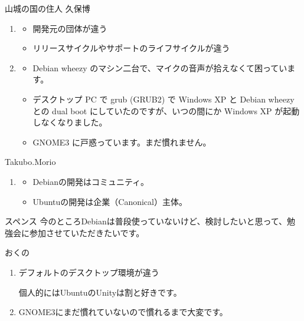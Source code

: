 \documentclass[mingoth,a4paper]{jsarticle}
\begin{document}
\begin{prework}{ 山城の国の住人 久保博 }
  \begin{enumerate}
  \item
    \begin{itemize}
    \item 開発元の団体が違う
    \item リリースサイクルやサポートのライフサイクルが違う
    \end{itemize}
  \item 
    \begin{itemize}
    \item Debian wheezy のマシン二台で、マイクの音声が拾えなくて困っています。
    \item デスクトップ PC で grub (GRUB2) で Windows XP と Debian wheezy との dual boot にしていたのですが、いつの間にか Windows XP が起動しなくなりました。
    \item  GNOME3 に戸惑っています。まだ慣れません。
    \end{itemize}
  \end{enumerate}
\end{prework}

\begin{prework}{ Takubo.Morio }
  \begin{enumerate}
  \item 
    \begin{itemize}
    \item Debianの開発はコミュニティ。
    \item Ubuntuの開発は企業（Canonical）主体。
    \end{itemize}
  \end{enumerate}
\end{prework}

\begin{prework}{ スペンス }
  今のところDebianは普段使っていないけど、検討したいと思って、勉強会に参加させていただきたいです。
\end{prework}

\begin{prework}{ おくの }
  \begin{enumerate}
  \item デフォルトのデスクトップ環境が違う

    個人的にはUbuntuのUnityは割と好きです。

  \item GNOME3にまだ慣れていないので慣れるまで大変です。
  \end{enumerate}
\end{prework}
\end{document}
